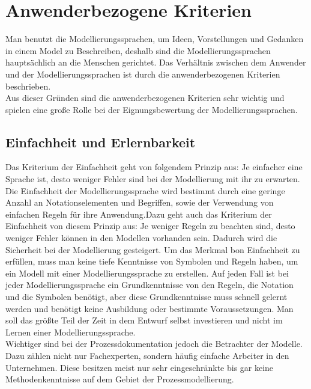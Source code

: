 \section{Anwenderbezogene Kriterien}
\label{sc:AnwenderbezogeneKriterien}
Man benutzt die Modellierungssprachen, um Ideen, Vorstellungen und Gedanken in einem Model zu Beschreiben, deshalb sind die Modellierungssprachen hauptsächlich an die Menschen gerichtet.
Das Verhältnis zwischen dem Anwender und der Modellierungssprachen ist durch die anwenderbezogenen Kriterien beschrieben.\\
Aus dieser Gründen sind die anwenderbezogenen Kriterien sehr wichtig und spielen eine große Rolle bei der Eignungsbewertung der Modellierungssprachen.   
\subsection{Einfachheit und Erlernbarkeit}
\label{sc:Einfachheit}
Das Kriterium der Einfachheit geht von folgendem Prinzip aus: Je einfacher eine Sprache ist, desto weniger Fehler sind bei der Modellierung mit ihr zu erwarten. Die Einfachheit der Modellierungssprache wird bestimmt durch eine geringe Anzahl an Notationselementen und Begriffen, sowie der Verwendung von einfachen Regeln für ihre Anwendung\cite{MT014}.Dazu geht auch das Kriterium der Einfachheit von diesem Prinzip aus: Je weniger Regeln zu beachten sind, desto weniger Fehler können in den Modellen vorhanden sein. Dadurch
wird die Sicherheit bei der Modellierung gesteigert\cite{MT006}.
Um das Merkmal bon Einfachheit zu erfüllen, muss man keine tiefe Kenntnisse von Symbolen und Regeln haben, um ein Modell mit einer Modellierungssprache zu erstellen. Auf jeden Fall ist bei jeder Modellierungssprache ein Grundkenntnisse von den Regeln, die Notation und die Symbolen benötigt, aber diese Grundkenntnisse muss schnell gelernt werden und benötigt keine Ausbildung oder bestimmte Voraussetzungen. Man soll das größte Teil der Zeit in dem Entwurf selbst investieren und nicht im Lernen einer Modellierungssprache. \\
Wichtiger sind bei der Prozessdokumentation jedoch die Betrachter der Modelle. Dazu zählen nicht nur Fachexperten, sondern häufig einfache Arbeiter in den Unternehmen. Diese besitzen meist nur sehr eingeschränkte bis gar keine Methodenkenntnisse auf dem Gebiet der Prozessmodellierung\cite{Lobe_2015}.



